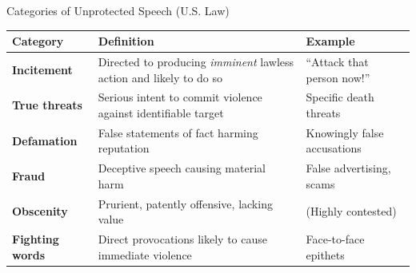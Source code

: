 ﻿\documentclass[aspectratio=169,11pt]{beamer}
\begin{document}
\begin{frame}{Categories of Unprotected Speech (U.S. Law)}
\begin{table}[h]
\centering
\small
\begin{tabular}{>{\bfseries}l p{5.5cm} p{4cm}}
\toprule
Category & Definition & Example \\
\midrule
Incitement & Directed to producing \textit{imminent} lawless action and likely to do so & ``Attack that person now!'' \\
True threats & Serious intent to commit violence against identifiable target & Specific death threats \\
Defamation & False statements of fact harming reputation & Knowingly false accusations \\
Fraud & Deceptive speech causing material harm & False advertising, scams \\
Obscenity & Prurient, patently offensive, lacking value & (Highly contested) \\
Fighting words & Direct provocations likely to cause immediate violence & Face-to-face epithets \\
\bottomrule
\end{tabular}
\end{table}
\end{frame}
\end{document}
